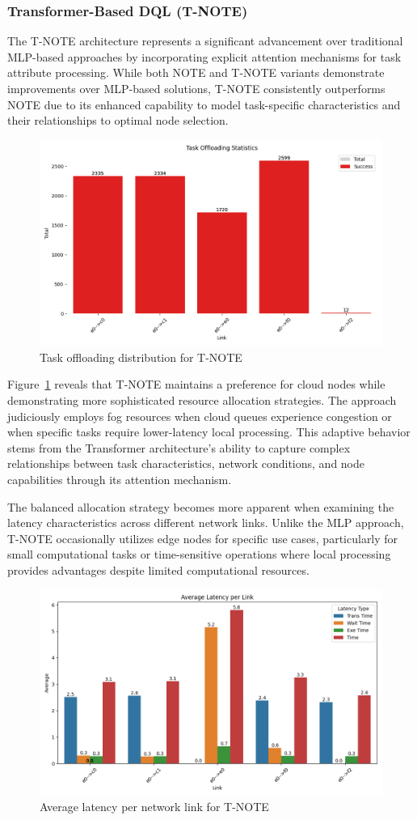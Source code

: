 \documentclass[preprint,3p,authoryear]{elsarticle}
\begin{document}
\subsubsection{Transformer-Based DQL (T-NOTE)}\label{subsubsec:T-NOTE-analysis}

The T-NOTE architecture represents a significant advancement over traditional MLP-based approaches by incorporating explicit attention mechanisms for task attribute processing. While both NOTE and T-NOTE variants demonstrate improvements over MLP-based solutions, T-NOTE consistently outperforms NOTE due to its enhanced capability to model task-specific characteristics and their relationships to optimal node selection.

\begin{figure}[H]
    \centering
    \includegraphics[width=0.5\linewidth]{figs/T-NOTE/task_offloading_statistics.png}
    \caption{Task offloading distribution for T-NOTE}
    \label{fig:T-NOTE-offloading-stats}
\end{figure}

Figure~\ref{fig:T-NOTE-offloading-stats} reveals that T-NOTE maintains a preference for cloud nodes while demonstrating more sophisticated resource allocation strategies. The approach judiciously employs fog resources when cloud queues experience congestion or when specific tasks require lower-latency local processing. This adaptive behavior stems from the Transformer architecture's ability to capture complex relationships between task characteristics, network conditions, and node capabilities through its attention mechanism.

The balanced allocation strategy becomes more apparent when examining the latency characteristics across different network links. Unlike the MLP approach, T-NOTE occasionally utilizes edge nodes for specific use cases, particularly for small computational tasks or time-sensitive operations where local processing provides advantages despite limited computational resources.

\begin{figure}[H]
    \centering
    \includegraphics[width=0.5\linewidth]{figs/T-NOTE/avg_latency_per_link.png}
    \caption{Average latency per network link for T-NOTE}
    \label{fig:T-NOTE-avg-latency}
\end{figure}
\end{document}
